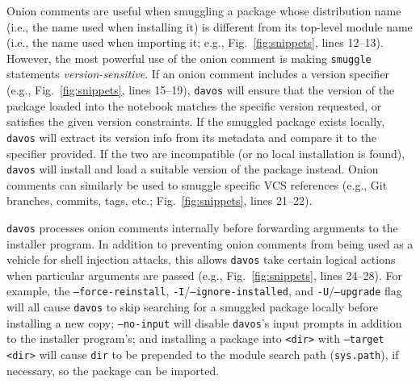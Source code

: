 \documentclass[preprint,12pt, a4paper]{elsarticle}
\begin{document}
Onion comments are useful when smuggling a package whose distribution name (i.e., the name used when installing it) is different from its top-level module name (i.e., the name used when importing it; e.g., Fig.~\ref{fig:snippets}, lines 12--13). However, the most powerful use of the onion comment is making \texttt{smuggle} statements \textit{version-sensitive}. If an onion comment includes a version specifier \cite{CoghStuf13} (e.g., Fig.~\ref{fig:snippets}, lines 15--19), \texttt{davos} will ensure that the version of the package loaded into the notebook matches the specific version requested, or satisfies the given version constraints. If the smuggled package exists locally, \texttt{davos} will extract its version info from its metadata and compare it to the specifier provided. If the two are incompatible (or no local installation is found), \texttt{davos} will install and load a suitable version of the package instead. Onion comments can similarly be used to smuggle specific VCS references (e.g., Git \cite{TorvHama05}  branches, commits, tags, etc.; Fig.~\ref{fig:snippets}, lines 21--22).


\texttt{davos} processes onion comments internally before forwarding arguments to the installer program. In addition to preventing onion comments from being used as a vehicle for shell injection attacks, this allows \texttt{davos} take certain logical actions when particular arguments are passed (e.g., Fig.~\ref{fig:snippets}, lines 24--28). For example, the \texttt{--force-reinstall}, \texttt{-I}/\texttt{--ignore-installed}, and \texttt{-U}/\texttt{--upgrade} flag will all cause \texttt{davos} to skip searching for a smuggled package locally before installing a new copy; \texttt{--no-input} will disable \texttt{davos}'s input prompts in addition to the installer program's; and installing a package into \texttt{<dir>} with \texttt{--target <dir>} will cause \texttt{dir} to be prepended to the module search path (\texttt{sys.path}), if necessary, so the package can be imported.
\end{document}
